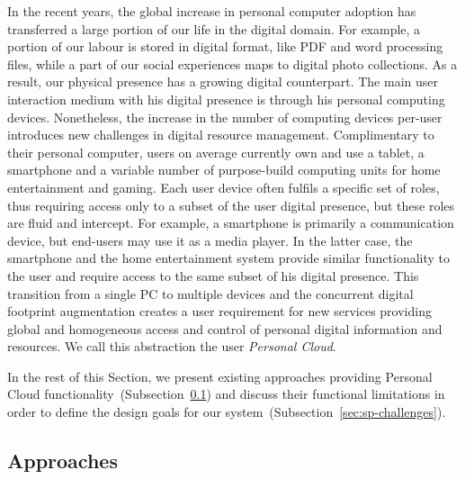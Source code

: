 In the recent years, the global increase in personal computer adoption has
transferred a large portion of our life in the digital domain. For example, a
portion of our labour is stored in digital format, like PDF and word processing
files, while a part of our social experiences maps to digital photo collections.
As a result, our physical presence has a growing digital counterpart. The main
user interaction medium with his digital presence is through his personal
computing devices. Nonetheless, the increase in the number of computing devices
per-user introduces new challenges in digital resource management.
Complimentary to their personal computer, users on average currently own and use
a tablet, a smartphone and a variable number of purpose-build computing units
for home entertainment and gaming.  Each user device often fulfils a specific
set of roles, thus requiring access only to a subset of the user digital
presence, but these roles are fluid and intercept.  For example, a smartphone is
primarily a communication device, but end-users may use it as a media player. In
the latter case, the smartphone and the home entertainment system provide
similar functionality to the user and require access to the same subset of his
digital presence. This transition from a single PC to multiple devices and the
concurrent digital footprint augmentation creates a user requirement for new
services providing global and homogeneous access and control of personal digital
information and resources. We call this abstraction the user \emph{Personal
  Cloud}. 

In the rest of this Section, we present existing approaches
providing Personal Cloud functionality~(Subsection~\ref{sec:sp-approaches}) and
discuss their functional limitations in order to define the design goals for our
\signpost system~(Subsection~\ref{sec:sp-challenges}). 

\subsection{Approaches} \label{sec:sp-approaches}


